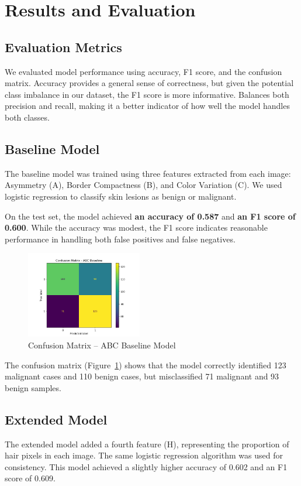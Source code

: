 \documentclass[10pt,twocolumn]{article}
\begin{document}
\section{Results and Evaluation}
\subsection{Evaluation Metrics}
We evaluated model performance using accuracy, F1 score, and the confusion matrix. Accuracy provides a general sense of correctness, but given the potential class imbalance in our dataset, the F1 score is more informative. Balances both precision and recall, making it a better indicator of how well the model handles both classes.
\subsection{Baseline Model}
The baseline model was trained using three features extracted from each image: Asymmetry (A), Border Compactness (B), and Color Variation (C). We used logistic regression to classify skin lesions as benign or malignant.

On the test set, the model achieved \textbf {an accuracy of 0.587} and \textbf{an F1 score of 0.600}. While the accuracy was modest, the F1 score indicates reasonable performance in handling both false positives and false negatives.

\begin{figure}[h]
    \centering
    \includegraphics[width=0.45\textwidth]{matrix_base.png}
    \caption{Confusion Matrix – ABC Baseline Model}
    \label{fig:matrix_baseline}
\end{figure}

The confusion matrix (Figure~\ref{fig:matrix_baseline}) shows that the model correctly identified 123 malignant cases and 110 benign cases, but misclassified 71 malignant and 93 benign samples.

\subsection{Extended Model}
The extended model added a fourth feature (H), representing the proportion of hair pixels in each image. The same logistic regression algorithm was used for consistency. This model achieved a slightly higher accuracy of 0.602 and an F1 score of 0.609.
\end{document}
